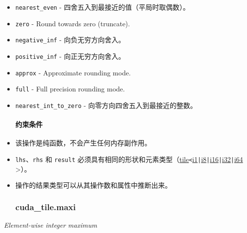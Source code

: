 \documentclass{article}
\begin{document}
\begin{itemize}
\item \texttt{nearest\_even} - 四舍五入到最接近的值（平局时取偶数）。
\item \texttt{zero} - Round towards zero (truncate).

\item \texttt{negative\_inf} - 向负无穷方向舍入。
\item \texttt{positive\_inf} - 向正无穷方向舍入。
\item \texttt{approx} - Approximate rounding mode.

\item \texttt{full} - Full precision rounding mode.

\item \texttt{nearest\_int\_to\_zero} - 向零方向四舍五入到最接近的整数。




\paragraph{约束条件}


\item 该操作是纯函数，不会产生任何内存副作用。
\item \texttt{lhs}、\texttt{rhs} 和 \texttt{result} 必须具有相同的形状和元素类型（\href{https://docs.nvidia.com/cuda/tile-ir/latest/sections/types.html#type-tile}{tile}\texttt{<}\href{https://docs.nvidia.com/cuda/tile-ir/latest/sections/types.html#subsection-element-types}{i1}\texttt{|}\href{https://docs.nvidia.com/cuda/tile-ir/latest/sections/types.html#subsection-element-types}{i8}\texttt{|}\href{https://docs.nvidia.com/cuda/tile-ir/latest/sections/types.html#subsection-element-types}{i16}\texttt{|}\href{https://docs.nvidia.com/cuda/tile-ir/latest/sections/types.html#subsection-element-types}{i32}\texttt{|}\href{https://docs.nvidia.com/cuda/tile-ir/latest/sections/types.html#subsection-element-types}{i64} >）。
\item 操作的结果类型可以从其操作数和属性中推断出来。




\subsubsection{cuda\_tile.maxi}


\end{itemize}
\textit{Element-wise integer maximum}
\end{document}
